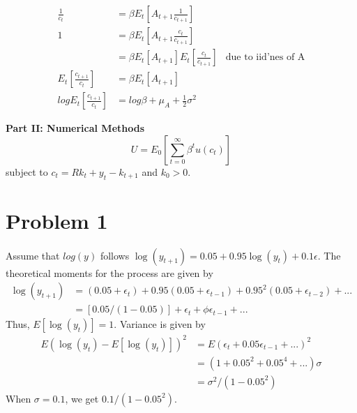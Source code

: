 \documentclass[12pt,letter]{article}
\begin{document}
\begin{align*}
\frac{1}{c_t} 	&= \beta E_t\left[ A_{t+1} \frac{1}{c_{t+1}} \right]\\
1				&= \beta E_t\left[ A_{t+1} \frac{c_t}{c_{t+1}} \right]\\
&= \beta E_t\left[ A_{t+1}\right] E_t\left[ \frac{c_t}{c_{t+1}} \right] &\text{due to iid'nes of A}\\
E_t\left[ \frac{c_{t+1}}{c_{t}} \right] &= \beta E_t\left[ A_{t+1} \right]\\
log E_t\left[ \frac{c_{t+1}}{c_{t}} \right] &= log \beta + \mu_A + \frac{1}{2}\sigma^2
\end{align*}

\textbf{Part II: Numerical Methods}
\begin{equation*}
U = E_0\left[ \sum_{t = 0}^{\infty} \beta^t u(c_t)\right] 
\end{equation*}
subject to $c_t = Rk_t + y_t - k_{t+1}$ and $ k_0 > 0$. 
\section{Problem 1} Assume that $log(y)$ follows $\log(y_{t+1}) = 0.05 + 0.95 \log(y_t) + 0.1\epsilon$. 
The theoretical moments for the process are given by 
\begin{equation*}
\begin{split}
	\log(y_{t+1}) &= (0.05 + \epsilon_t) + 0.95 (0.05 + \epsilon_{t-1}) + 0.95^2(0.05 + \epsilon_{t-2}) + ...\\
	&= \left[0.05/(1-0.05)\right] + \epsilon_t + \phi \epsilon_{t-1} + ...
\end{split}
\end{equation*}
Thus, $E\left[\log(y_t)\right] = 1$. Variance is given by
\begin{equation*}
	\begin{split}
		E(\log(y_t) - E\left[\log(y_t)\right])^2 &= E(\epsilon_t + 0.05\epsilon_{t-1} +...)^2\\
		&= (1 +0.05^2 + 0.05^4 + ...) \sigma\\
		&= \sigma^2/(1-0.05^2)	
	\end{split}
\end{equation*}
When $\sigma = 0.1$, we get $0.1/(1-0.05^2) $.
\end{document}
